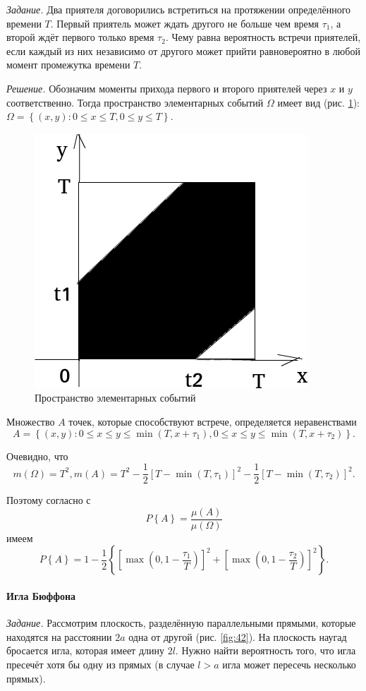 \documentclass{book}
\begin{document}
\textit{Задание.} Два приятеля договорились встретиться на протяжении определённого времени $T$.
Первый приятель может ждать другого не больше чем время $ \tau_1$, а второй ждёт первого только время $ \tau_2$.
Чему равна вероятность встречи приятелей, если каждый из них независимо от другого может прийти равновероятно в любой момент промежутка времени $T$.

\textit{Решение.} Обозначим моменты прихода первого и второго приятелей через $x$ и $y$ соответственно.
Тогда пространство элементарных событий $ \Omega $ имеет вид (рис. \ref{fig:41}): $ \Omega = \left\{ \left( x, y \right): 0 \leq  x \leq T, 0 \leq y \leq T \right\} $.

\begin{figure}[h!]
  \centering
  \includegraphics[width=.4\textwidth]{./pictures/4_1.png}
  \caption{Пространство элементарных событий}
  \label{fig:41}
\end{figure}

Множество $A$ точек, которые способствуют встрече, определяется неравенствами
$$A =
\left\{ \left( x, y \right):
0 \leq x \leq y \leq \min \left( T, x + \tau_1 \right),
0 \leq x \leq y \leq \min \left( T, x + \tau_2 \right) \right\}.$$

Очевидно, что
$$m \left( \Omega \right) =
T^2,
m \left( A \right) =
T^2 - \frac{1}{2} \left[ T - \min \left( T, \tau_1 \right) \right]^2 - \frac{1}{2} \left[ T - \min \left( T, \tau_2 \right) \right]^2.$$

Поэтому согласно с
$$P \left\{ A \right\} =
\frac{ \mu \left( A \right) }{ \mu \left( \Omega \right) }$$
имеем
$$P \left\{ A \right\} =
1 - \frac{1}{2} \left\{ \left[ \max \left( 0, 1 - \frac{ \tau_1}{T} \right) \right]^2 + \left[ \max \left( 0, 1 - \frac{ \tau_2}{T} \right) \right]^2 \right\}.$$

\paragraph*{Игла Бюффона}

\textit{Задание.} Рассмотрим плоскость, разделённую параллельными прямыми, которые находятся на расстоянии $2a$ одна от другой (рис. \ref{fig:42}).
На плоскость наугад бросается игла, которая имеет длину $2l$.
Нужно найти вероятность того, что игла пресечёт хотя бы одну из прямых (в случае $l > a$ игла может пересечь несколько прямых).
\end{document}
